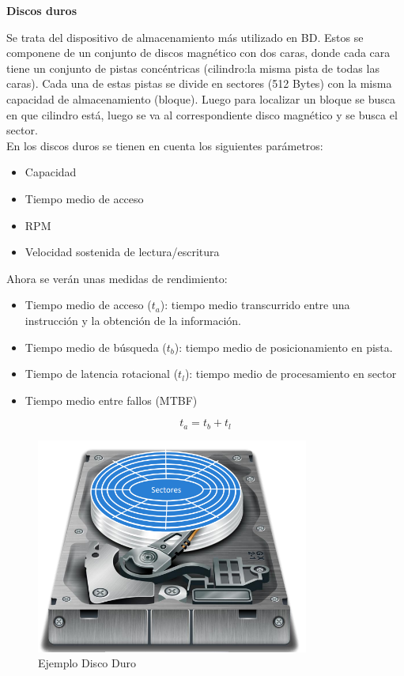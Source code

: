 \documentclass[a4paper,11pt]{article}
\begin{document}
\textbf{Discos duros}

Se trata del dispositivo de almacenamiento más utilizado en BD. Estos se componene de un conjunto de discos magnético con dos caras, donde cada cara tiene un conjunto de pistas concéntricas (cilindro:la misma pista de todas las caras). Cada una de estas pistas se divide en sectores (512 Bytes) con la misma capacidad de almacenamiento (bloque). Luego para localizar un bloque se busca en que cilindro está, luego se va al correspondiente disco magnético y se busca el sector. \\

En los discos duros se tienen en cuenta los siguientes parámetros:

\begin{itemize}
\item Capacidad
\item Tiempo medio de acceso
\item RPM
\item Velocidad sostenida de lectura/escritura
\end{itemize}

Ahora se verán unas medidas de rendimiento:

\begin{itemize}
\item Tiempo medio de acceso ($t_a$): tiempo medio transcurrido entre una instrucción y la obtención de la información. 

\item Tiempo medio de búsqueda ($t_b$): tiempo medio de posicionamiento en pista.

\item Tiempo de latencia rotacional ($t_l$): tiempo medio de procesamiento en sector

\item Tiempo medio entre fallos (MTBF)
\end{itemize}

\begin{equation*}
t_a=t_b+t_l
\end{equation*}

\begin{figure}[h]
\centering
\caption{Ejemplo Disco Duro}
\includegraphics[scale=1,width=0.8\textwidth]{disco_duro.png}
\end{figure}
\end{document}
